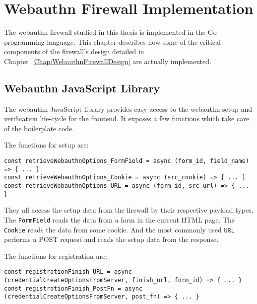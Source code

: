 

\chapter{Webauthn Firewall Implementation}

The webauthn firewall studied in this thesis is implemented in the Go programming language. This chapter describes how some of the critical components of the firewall's design detailed in Chapter~\ref{Chap:WebauthnFirewallDesign} are actually implemented.

\section{Webauthn JavaScript Library}

The webauthn JavaScript library provides easy access to the webauthn setup and verification life-cycle for the frontend. It exposes a few functions which take care of the boilerplate code. 

The functions for setup are:

\begin{lstlisting}
const retrieveWebauthnOptions_FormField = async (form_id, field_name) => { ... }
const retrieveWebauthnOptions_Cookie = async (src_cookie) => { ... }
const retrieveWebauthnOptions_URL = async (form_id, src_url) => { ... }
\end{lstlisting}

They all access the setup data from the firewall by their respective payload types. The \lstinline{FormField} reads the data from a form in the current HTML page. The \lstinline{Cookie} reads the data from some cookie. And the most commonly used \lstinline{URL} performs a POST request and reads the setup data from the response.

The functions for registration are:

\begin{lstlisting}
const registrationFinish_URL = async (credentialCreateOptionsFromServer, finish_url, form_id) => { ... }
const registrationFinish_PostFn = async (credentialCreateOptionsFromServer, post_fn) => { ... }
\end{lstlisting}

